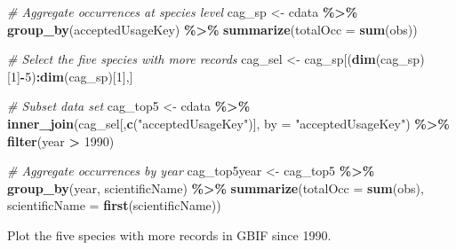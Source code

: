 \documentclass[
]{article}
\newenvironment{Shaded}{\begin{snugshade}}{\end{snugshade}}
\newcommand{\AttributeTok}[1]{\textcolor[rgb]{0.13,0.29,0.53}{#1}}
\newcommand{\CommentTok}[1]{\textcolor[rgb]{0.56,0.35,0.01}{\textit{#1}}}
\newcommand{\DecValTok}[1]{\textcolor[rgb]{0.00,0.00,0.81}{#1}}
\newcommand{\FunctionTok}[1]{\textcolor[rgb]{0.13,0.29,0.53}{\textbf{#1}}}
\newcommand{\NormalTok}[1]{#1}
\newcommand{\OtherTok}[1]{\textcolor[rgb]{0.56,0.35,0.01}{#1}}
\newcommand{\SpecialCharTok}[1]{\textcolor[rgb]{0.81,0.36,0.00}{\textbf{#1}}}
\newcommand{\StringTok}[1]{\textcolor[rgb]{0.31,0.60,0.02}{#1}}
\begin{document}
\begin{Shaded}
\begin{Highlighting}[]
\CommentTok{\# Aggregate occurrences at species level}
\NormalTok{cag\_sp }\OtherTok{\textless{}{-}}\NormalTok{ cdata }\SpecialCharTok{\%\textgreater{}\%}
  \FunctionTok{group\_by}\NormalTok{(acceptedUsageKey) }\SpecialCharTok{\%\textgreater{}\%}
  \FunctionTok{summarize}\NormalTok{(}\AttributeTok{totalOcc =} \FunctionTok{sum}\NormalTok{(obs))}

\CommentTok{\# Select the five species with more records }
\NormalTok{cag\_sel }\OtherTok{\textless{}{-}}\NormalTok{ cag\_sp[(}\FunctionTok{dim}\NormalTok{(cag\_sp)[}\DecValTok{1}\NormalTok{]}\SpecialCharTok{{-}}\DecValTok{5}\NormalTok{)}\SpecialCharTok{:}\FunctionTok{dim}\NormalTok{(cag\_sp)[}\DecValTok{1}\NormalTok{],]}

\CommentTok{\# Subset data set}
\NormalTok{cag\_top5 }\OtherTok{\textless{}{-}}\NormalTok{ cdata }\SpecialCharTok{\%\textgreater{}\%} 
  \FunctionTok{inner\_join}\NormalTok{(cag\_sel[,}\FunctionTok{c}\NormalTok{(}\StringTok{"acceptedUsageKey"}\NormalTok{)], }\AttributeTok{by =} \StringTok{"acceptedUsageKey"}\NormalTok{) }\SpecialCharTok{\%\textgreater{}\%}
  \FunctionTok{filter}\NormalTok{(year }\SpecialCharTok{\textgreater{}} \DecValTok{1990}\NormalTok{)}

\CommentTok{\# Aggregate occurrences by year}
\NormalTok{cag\_top5year }\OtherTok{\textless{}{-}}\NormalTok{ cag\_top5 }\SpecialCharTok{\%\textgreater{}\%}
  \FunctionTok{group\_by}\NormalTok{(year, scientificName) }\SpecialCharTok{\%\textgreater{}\%}
  \FunctionTok{summarize}\NormalTok{(}\AttributeTok{totalOcc =} \FunctionTok{sum}\NormalTok{(obs), }\AttributeTok{scientificName =} \FunctionTok{first}\NormalTok{(scientificName))}
\end{Highlighting}
\end{Shaded}

Plot the five species with more records in GBIF since 1990.
\end{document}
